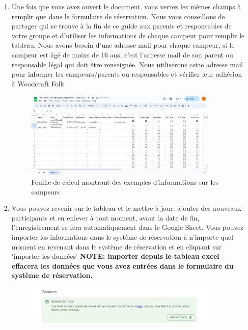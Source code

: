 \documentclass[a4paper, 11pt]{report}
\begin{document}
\begin{enumerate}
\begin{enumerate}
\begin{figure}[H]
            \caption{E-mail montrant la feuille de calcul partag\'ee}
        \end{figure}
        \item Une fois que vous avez ouvert le document, vous verrez les m\^emes champs \`a remplir que dans le formulaire de r\'eservation. Nous vous conseillons de partager   qui se trouve \`a la fin de ce guide aux parents et responsables de votre groupe et d'utiliser les informations de chaque campeur pour remplir le tableau. Nous avons besoin d'une adresse mail pour chaque campeur, si le campeur est \^ag\'e de moins de 16 ans, c'est l'adresse mail de son parent ou responsable l\'egal qui doit \^etre renseign\'ee. Nous utiliserons cette adresse mail pour informer les campeurs/parents ou responsables et v\'erifier leur adh\'esion \`a Woodcraft Folk.
        \begin{figure}[H]
            \centering
            \includegraphics[width=0.9\textwidth]{assets/2-spreadsheet.png}
            \caption{Feuille de calcul montrant des exemples d'informations sur les campeurs}
        \end{figure}
        \item Vous pouvez revenir sur le tableau et le mettre \`a jour, ajouter des nouveaux participants et en enlever \`a tout moment, avant la date de fin, l'enregistrement se fera automatiquement dans le Google Sheet. Vous pouvez importer les informations dans le syst\`eme de r\'eservation \`a n'importe quel moment en revenant dans le syst\`eme de r\'eservation et en cliquant sur `importer les donn\'ees'  \textbf{NOTE: importer depuis le tableau excel effacera les donn\'ees que vous avez entr\'ees dans le formulaire du syst\`eme de r\'eservation.}
        \begin{figure}[H]
            \centering
            \includegraphics[width=0.9\textwidth]{assets/2-spreadsheet-import.png}

\end{figure}
\end{enumerate}
\end{enumerate}
\end{document}
